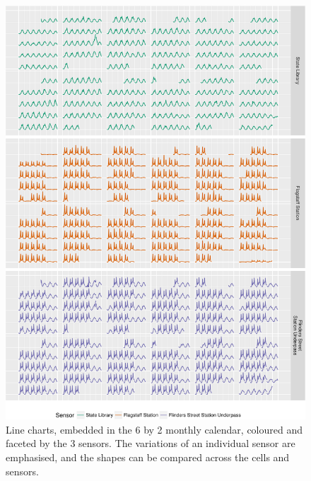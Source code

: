 \documentclass[article]{jss}
\theoremstyle{definition}
\theoremstyle{definition}
\theoremstyle{remark}
\begin{document}
\begin{CodeChunk}
\begin{figure}

{\centering \includegraphics[width=\textwidth]{figure/facet-1} 

}

\caption[Line charts, embedded in the 6 by 2 monthly calendar,
coloured and faceted by the 3 sensors. The variations of an individual
sensor are emphasised, and the shapes can be compared across the cells
and sensors.]{Line charts, embedded in the 6 by 2 monthly calendar,
coloured and faceted by the 3 sensors. The variations of an individual
sensor are emphasised, and the shapes can be compared across the cells
and sensors.}\label{fig:facet}
\end{figure}
\end{CodeChunk}
\end{document}
